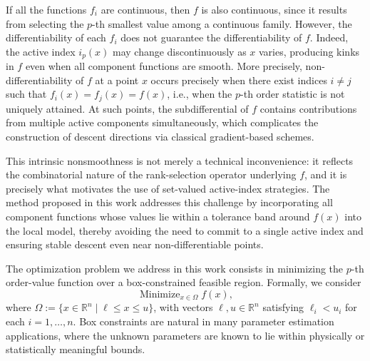 \documentclass[11pt]{article}
\newcommand{\minimize}{\mathop{\text{Minimize}}}
\begin{document}
If all the functions $f_i$ are continuous, then $f$ is also continuous, 
since it results from selecting the $p$-th smallest value among a 
continuous family. However, the differentiability of each $f_i$ does 
not guarantee the differentiability of $f$. Indeed, the active index 
$i_p(x)$ may change discontinuously as $x$ varies, producing kinks in 
$f$ even when all component functions are smooth. More precisely, 
non-differentiability of $f$ at a point $x$ occurs precisely when there 
exist indices $i \neq j$ such that $f_i(x) = f_j(x) = f(x)$, i.e., 
when the $p$-th order statistic is not uniquely attained. At such 
points, the subdifferential of $f$ contains contributions from multiple 
active components simultaneously, which complicates the construction of 
descent directions via classical gradient-based schemes.

This intrinsic nonsmoothness is not merely a technical inconvenience: 
it reflects the combinatorial nature of the rank-selection operator 
underlying $f$, and it is precisely what motivates the use of 
set-valued active-index strategies. The method proposed in this work 
addresses this challenge by incorporating all component functions 
whose values lie within a tolerance band around $f(x)$ into the 
local model, thereby avoiding the need to commit to a single active 
index and ensuring stable descent even near non-differentiable points.

The optimization problem we address in this work consists in minimizing 
the $p$-th order-value function over a box-constrained feasible region. 
Formally, we consider
\begin{equation}
    \minimize_{x \in \Omega} f(x), \label{ovo-problem}
\end{equation}
where $\Omega := \{x \in \mathbb{R}^n \mid \ell \leq x \leq u\}$, with 
vectors $\ell, u \in \mathbb{R}^n$ satisfying $\ell_i < u_i$ for each 
$i = 1, \ldots, n$. Box constraints are natural in many parameter 
estimation applications, where the unknown parameters are known to lie 
within physically or statistically meaningful bounds.
\end{document}
